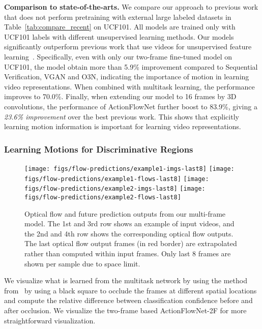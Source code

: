 \documentclass[10pt,twocolumn,letterpaper]{article}
\begin{document}
\textbf{Comparison to state-of-the-arts.}
We compare our approach to previous work that does not perform pretraining with external large labeled datasets in Table~\ref{tab:compare_recent} on UCF101.
All models are trained only with UCF101 labels with different unsupervised learning methods.
Our models significantly outperform previous work that use videos for unsupervised feature learning~\cite{misra2016shuffle, vondrick2016generating, fernando2016self, lee2017unsupervised}.
Specifically, even with only our two-frame fine-tuned model on UCF101, the model obtain more than 5.9\% improvement compared to Sequential Verification, VGAN and O3N, indicating the importance of motion in learning video representations.
When combined with multitask learning, the performance improves to 70.0\%. Finally, when extending our model to 16 frames by 3D convolutions, the performance of ActionFlowNet further boost to 83.9\%, giving a \emph{23.6\% improvement} over the best previous work.
This shows that explicitly learning motion information is important for learning video representations.



\vspace{-.5em}
\subsubsection{Learning Motions for Discriminative Regions}
\vspace{-.5em}

\begin{figure}
\centering
	\texttt{[image: figs/flow-predictions/example1-imgs-last8]}
	\texttt{[image: figs/flow-predictions/example1-flows-last8]}
	\texttt{[image: figs/flow-predictions/example2-imgs-last8]}
	\texttt{[image: figs/flow-predictions/example2-flows-last8]}
    \caption{Optical flow and future prediction outputs from our multi-frame model. The 1st and 3rd row shows an example of input videos, and the 2nd and 4th row shows the corresponding optical flow outputs. The last optical flow output frames (in red border) are extrapolated rather than computed within input frames. Only last 8 frames are shown per sample due to space limit.}
	\label{fig:future}
  \vspace{-1em}
\end{figure}

We visualize what is learned from the multitask network by using the method from~\cite{zeilerF14} by using a black square to occlude the frames at different spatial locations and compute the relative difference between classification confidence before and after occlusion. We visualize the two-frame based ActionFlowNet-2F for more straightforward visualization.
\end{document}
